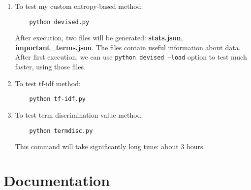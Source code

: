 \documentclass{article}
\begin{document}
\begin{enumerate}
  \item To test my custom entropy-based method:
  \begin{verbatim}
    python devised.py
  \end{verbatim}
  After execution, two files will be generated: \textbf{stats.json},
  \textbf{important\_terms.json}.
  The files contain useful information about data.
  After first execution, we can use \texttt{python devised --load}
  option to test much faster, using those files.

  \item To test tf-idf method:
  \begin{verbatim}
    python tf-idf.py
  \end{verbatim}
  \item To test term discrimination value method:
  \begin{verbatim}
    python termdisc.py
  \end{verbatim}
  This command will take significantly long time: about 3 hours.
\end{enumerate}

\section{Documentation}
\end{document}
